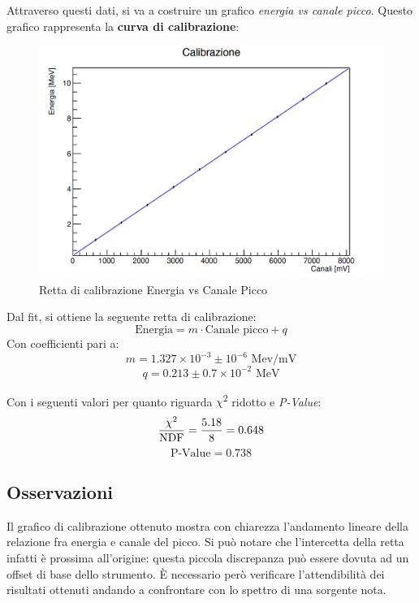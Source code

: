 \documentclass[a4paper,10pt]{article}
\newcommand*{\unit}[1]{\ensuremath{\mathrm{\,#1}}}
\begin{document}
\noindent Attraverso questi dati, si va a costruire un grafico \textit{energia vs canale picco}. Questo grafico rappresenta la \textbf{curva di calibrazione}:

\begin{figure}[h!]
    \centering
    \includegraphics[scale=0.45]{grafici/rettacalibrazione}
    \caption{Retta di calibrazione Energia vs Canale Picco}
\end{figure}

\noindent Dal fit, si ottiene la seguente retta di calibrazione:
$$
    \textrm{Energia} = m \cdot \textrm{Canale picco} + q
$$
Con coefficienti pari a:
$$
    m = 1.327 \times 10^{-3} \pm 10^{-6}\, \unit{Mev/mV}
$$
$$
    q = 0.213 \pm 0.7 \times 10^{-2}\, \unit{MeV}
$$

\noindent Con i seguenti valori per quanto riguarda $\chi$\textsuperscript{2} ridotto e \textit{P-Value}:
$$
    \frac{\chi\textsuperscript{2}}{\textrm{NDF}} = \frac{5.18}{8} = 0.648
$$
$$
    \textrm{P-Value} = 0.738
$$

\subsection{Osservazioni}
Il grafico di calibrazione ottenuto mostra con chiarezza l'andamento lineare della relazione fra energia e canale del picco. Si pu\`o notare che l'intercetta della retta infatti \`e prossima all'origine: questa piccola discrepanza pu\`o essere dovuta ad un offset di base dello strumento. 
\`E necessario per\`o verificare l'attendibilit\`a dei risultati ottenuti andando a confrontare con lo spettro di una sorgente nota.

\end{document}
